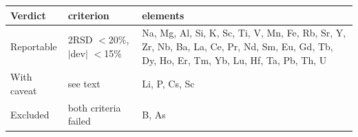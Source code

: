 \begin{tabular}{@{}p{2.3cm}p{2.0cm}p{8.0cm}@{}}
\toprule
Verdict & criterion & elements \\
\midrule
Reportable & 2RSD $<$20\%, $|$dev$|$ $<$15\% & Na, Mg, Al, Si, K, Sc, Ti, V, Mn, Fe, Rb, Sr, Y, Zr, Nb, Ba, La, Ce, Pr, Nd, Sm, Eu, Gd, Tb, Dy, Ho, Er, Tm, Yb, Lu, Hf, Ta, Pb, Th, U \\
\addlinespace
With caveat & see text & Li, P, Cs, Sc \\
\addlinespace
Excluded & both criteria failed & B, As \\
\bottomrule
\end{tabular}
